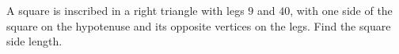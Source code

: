 A square is inscribed in a right triangle with legs $9$ and $40$, with one side of the square on the hypotenuse and its opposite vertices on the legs. Find the square side length.
